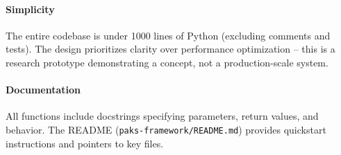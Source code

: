 \paragraph{Simplicity} The entire codebase is under 1000 lines of Python (excluding comments and tests). The design prioritizes clarity over performance optimization -- this is a research prototype demonstrating a concept, not a production-scale system.

\paragraph{Documentation} All functions include docstrings specifying parameters, return values, and behavior. The README (\texttt{paks-framework/README.md}) provides quickstart instructions and pointers to key files.
